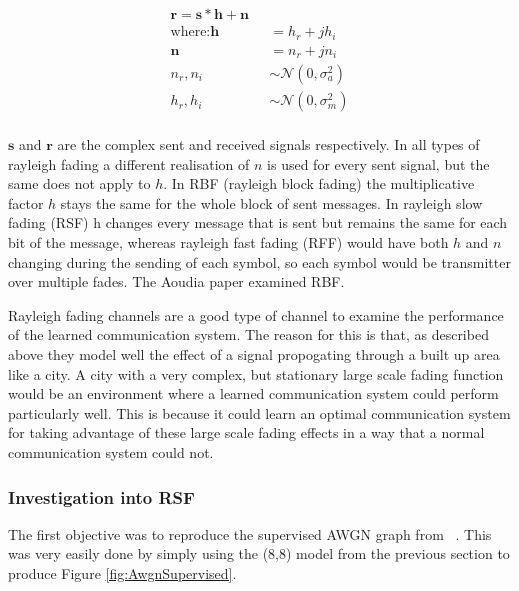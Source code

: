 \documentclass[12pt,onecolumn,letterpaper]{article}
\begin{document}
\begin{align}
   \mathbf{r} = \mathbf{s}*\mathbf{h} + \mathbf{n} \mbox{ }&\nonumber\\
   \mbox{where:}\mathbf{h} &= h_r + jh_i \nonumber\\
   \mathbf{n} &= n_r + jn_i \nonumber\\
   n_r,n_i &\sim \mathcal{N}(0,\sigma_a^2) \nonumber\\
   h_r,h_i &\sim \mathcal{N}(0,\sigma_m^2) \nonumber\\
   \label{eq:RaylieghDef}
\end{align}

$\mathbf{s}$ and $\mathbf{r}$ are the complex sent and received signals respectively. In all types of rayleigh fading a different realisation of $n$ is used for every sent signal, but the same does not apply to $h$. In RBF (rayleigh block fading) the multiplicative factor $h$ stays the same for the whole block of sent messages. In rayleigh slow fading (RSF) h changes every message that is sent but remains the same for each bit of the message, whereas rayleigh fast fading (RFF) would have both $h$ and $n$ changing during the sending of each symbol, so each symbol would be transmitter over multiple fades. The Aoudia paper examined RBF.

Rayleigh fading channels are a good type of channel to examine the performance of the learned communication system. The reason for this is that, as described above they model well the effect of a signal propogating through a built up area like a city. A city with a very complex, but stationary large scale fading function would be an environment where a learned communication system could perform particularly well. This is because it could learn an optimal communication system for taking advantage of these large scale fading effects in a way that a normal communication system could not.

\subsubsection{Investigation into RSF}

The first objective was to reproduce the supervised AWGN graph from ~\cite{Aoudia}. This was very easily done by simply using the (8,8) model from the previous section to produce Figure \ref{fig:AwgnSupervised}.
\end{document}
